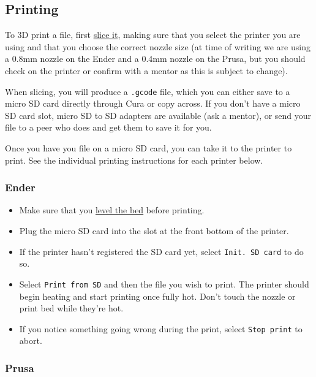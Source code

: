 \documentclass[12pt]{report}
\begin{document}
\subsection*{Printing}
\label{sec:printing}

To 3D print a file, first \hyperref[sec:slicing]{slice it}, making sure that you
select the printer you are using and that you choose the correct nozzle size (at
time of writing we are using a 0.8mm nozzle on the Ender and a 0.4mm nozzle on
the Prusa, but you should check on the printer or confirm with a mentor as this
is subject to change). \par
When slicing, you will produce a \texttt{.gcode} file, which you can either save
to a micro SD card directly through Cura or copy across. If you don't have a
micro SD card slot, micro SD to SD adapters are available (ask a mentor), or
send your file to a peer who does and get them to save it for you. \par
Once you have you file on a micro SD card, you can take it to the printer to
print. See the individual printing instructions for each printer below. 

\subsubsection*{Ender}

\begin{itemize}
    \item Make sure that you \hyperref[sec:levelling]{level the bed} before
        printing.
    \item Plug the micro SD card into the slot at the front bottom of the
        printer.
    \item If the printer hasn't registered the SD card yet, select
        \texttt{Init. SD card} to do so.
    \item Select \texttt{Print from SD} and then the file you wish to
        print. The printer should begin heating and start printing once fully
        hot. Don't touch the nozzle or print bed while they're hot.
    \item If you notice something going wrong during the print, select
        \texttt{Stop print} to abort.
\end{itemize}

\subsubsection*{Prusa}
\end{document}
